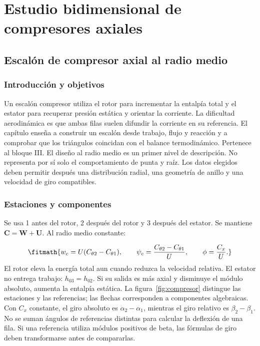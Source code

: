 \documentclass[10pt,openany]{book}
\begin{document}
\part{Estudio bidimensional de compresores axiales}

\chapter{Escalón de compresor axial al radio medio}
\label{chap:c07}


\section{Introducción y objetivos}

Un escalón compresor utiliza el rotor para incrementar la entalpía total y el estator para recuperar presión estática y orientar la corriente. La dificultad aerodinámica es que ambas filas suelen difundir la corriente en su referencia. El capítulo enseña a construir un escalón desde trabajo, flujo y reacción y a comprobar que los triángulos coincidan con el balance termodinámico. Pertenece al bloque III.
El diseño al radio medio es un primer nivel de descripción. No representa por sí solo el comportamiento de punta y raíz. Los datos elegidos deben permitir después una distribución radial, una geometría de anillo y una velocidad de giro compatibles.

\section{Estaciones y componentes}

Se usa 1 antes del rotor, 2 después del rotor y 3 después del estator. Se mantiene \(\mathbf C=\mathbf W+\mathbf U\). Al radio medio constante:

\[
\fitmath{w_c=U(C_{\theta2}-C_{\theta1}),\qquad
\psi_c=\frac{C_{\theta2}-C_{\theta1}}U,\qquad \phi=\frac{C_x}U.}
\]
El rotor eleva la energía total aun cuando reduzca la velocidad relativa. El estator no entrega trabajo: \(h_{03}=h_{02}\). Si su salida es más axial y disminuye el módulo absoluto, aumenta la entalpía estática. La figura~\ref{fig:compresor} distingue las estaciones y las referencias; las flechas corresponden a componentes algebraicas.
Con \(C_x\) constante, el giro absoluto es \(\alpha_2-\alpha_1\), mientras el giro relativo es \(\beta_2-\beta_1\). No se suman ángulos de referencias distintas para calcular la deflexión de una fila. Si una referencia utiliza módulos positivos de beta, las fórmulas de giro deben transformarse antes de compararlas.
\end{document}
